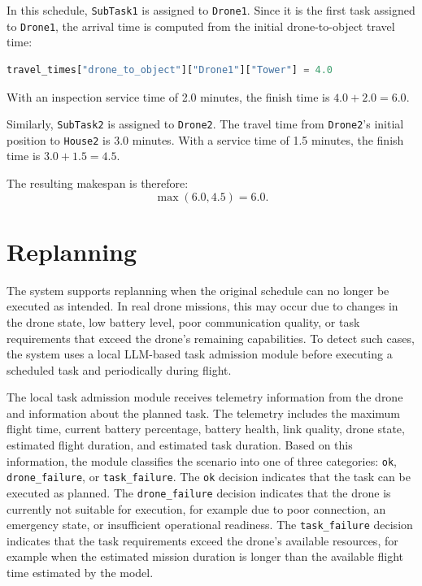 In this schedule, \texttt{SubTask1} is assigned to \texttt{Drone1}. 
Since it is the first task assigned to \texttt{Drone1}, the arrival time is computed from the initial drone-to-object travel time:

\begin{lstlisting}[language=Python, numbers=none]
travel_times["drone_to_object"]["Drone1"]["Tower"] = 4.0
\end{lstlisting}

With an inspection service time of 2.0 minutes, the finish time is \(4.0 + 2.0 = 6.0\).

Similarly, \texttt{SubTask2} is assigned to \texttt{Drone2}. 
The travel time from \texttt{Drone2}'s initial position to \texttt{House2} is 3.0 minutes. 
With a service time of 1.5 minutes, the finish time is \(3.0 + 1.5 = 4.5\).

The resulting makespan is therefore:
\[
\max(6.0, 4.5) = 6.0.
\]

\section{Replanning}

The system supports replanning when the original schedule can no longer be executed as intended. 
In real drone missions, this may occur due to changes in the drone state, low battery level, poor communication quality, 
or task requirements that exceed the drone's remaining capabilities. 
To detect such cases, 
the system uses a local LLM-based task admission module before executing a scheduled task and periodically during flight.

The local task admission module receives telemetry information from the drone and information about the planned task. 
The telemetry includes the maximum flight time, current battery percentage, battery health, link quality, drone state, 
estimated flight duration, and estimated task duration. 
Based on this information, the module classifies the scenario into one of three categories: 
\texttt{ok}, \texttt{drone\_failure}, or \texttt{task\_failure}. 
The \texttt{ok} decision indicates that the task can be executed as planned. 
The \texttt{drone\_failure} decision indicates that the drone is currently not suitable for execution, 
for example due to poor connection, an emergency state, or insufficient operational readiness. 
The \texttt{task\_failure} decision indicates that the task requirements exceed the drone's available resources, 
for example when the estimated mission duration is longer than the available flight time estimated by the model.

